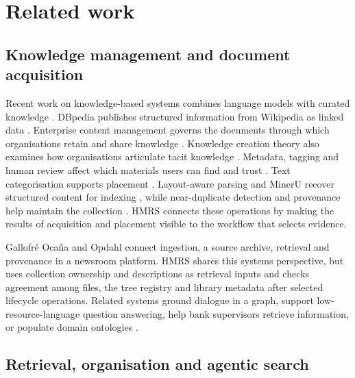 \section{Related work}
\label{sec:related}

\subsection{Knowledge management and document acquisition}

Recent work on knowledge-based systems combines language models with curated
knowledge \citep{yang-kbs-llm-2025}. DBpedia publishes structured
information from Wikipedia as linked data \citep{auer-dbpedia-kb-2007}.
Enterprise content management governs the documents through which
organisations retain and share knowledge
\citep{paivarinta-ecm-2005,tyrvaainen-ecm-2006}. Knowledge creation theory
also examines how organisations articulate tacit knowledge
\citep{nonaka-seci-1994}.
Metadata, tagging and human review affect which materials users can find and
trust \citep{park-metadata-quality-2009,golder-tagging-2006,mosqueira-rey-hitl-2022}.
Text categorisation supports placement \citep{sebastiani2002machine}.
Layout-aware parsing and MinerU recover structured content for indexing
\citep{zhong-publaynet-layout-2019,huang-layoutlmv3-docai-2022,mineru}, while
near-duplicate detection and provenance help maintain the collection
\citep{manku-near-dup-2007,missier-prov-2013,cheney-provenance-2009}.
HMRS connects these operations by making the results of acquisition and
placement visible to the workflow that selects evidence.

Gallofr\'e Oca\~na and Opdahl \citep{ocaa2023software} connect ingestion,
a source archive, retrieval and provenance in a newsroom platform. HMRS
shares this systems perspective, but uses collection ownership and descriptions
as retrieval inputs and checks agreement among files, the tree registry and
library metadata after selected lifecycle operations. Related systems ground
dialogue in a graph, support low-resource-language question answering, help
bank supervisors retrieve information, or populate domain ontologies
\citep{yang2024building,budur2024building,aarab2024system,ciatto2025large}.

\subsection{Retrieval, organisation and agentic search}

